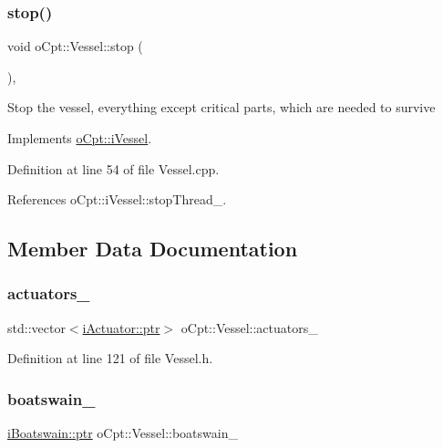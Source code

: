 \subsubsection{\texorpdfstring{stop()}{stop()}}
{\footnotesize\ttfamily void o\+Cpt\+::\+Vessel\+::stop (\begin{DoxyParamCaption}{ }\end{DoxyParamCaption})\hspace{0.3cm}{\ttfamily [override]}, {\ttfamily [virtual]}}

Stop the vessel, everything except critical parts, which are needed to survive 

Implements \hyperlink{classo_cpt_1_1i_vessel_a1cfbb23ae3e73a3587688bf7fbc3f0af}{o\+Cpt\+::i\+Vessel}.



Definition at line 54 of file Vessel.\+cpp.



References o\+Cpt\+::i\+Vessel\+::stop\+Thread\+\_\+.



\subsection{Member Data Documentation}
\hypertarget{classo_cpt_1_1_vessel_a9ca55a7aa5444fcaed183ebe9861198d}{}\label{classo_cpt_1_1_vessel_a9ca55a7aa5444fcaed183ebe9861198d} 
\subsubsection{\texorpdfstring{actuators\+\_\+}{actuators\_}}
{\footnotesize\ttfamily std\+::vector$<$\hyperlink{classo_cpt_1_1i_actuator_a35847799558e92bb84fb6c71de772cac}{i\+Actuator\+::ptr}$>$ o\+Cpt\+::\+Vessel\+::actuators\+\_\+\hspace{0.3cm}{\ttfamily [protected]}}



Definition at line 121 of file Vessel.\+h.

\hypertarget{classo_cpt_1_1_vessel_a7d23ca83ab0b60ced457b6c08ff8f171}{}\label{classo_cpt_1_1_vessel_a7d23ca83ab0b60ced457b6c08ff8f171} 
\subsubsection{\texorpdfstring{boatswain\+\_\+}{boatswain\_}}
{\footnotesize\ttfamily \hyperlink{classo_cpt_1_1i_boatswain_ad5e2819c6252955a7eddba4a4c980e3c}{i\+Boatswain\+::ptr} o\+Cpt\+::\+Vessel\+::boatswain\+\_\+\hspace{0.3cm}{\ttfamily [protected]}}



